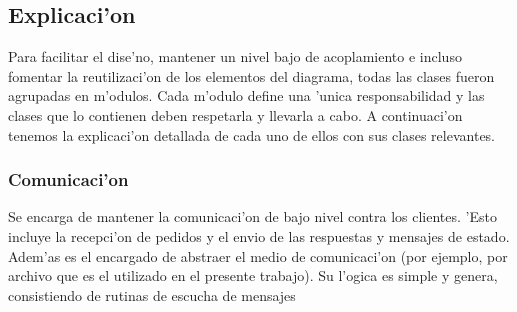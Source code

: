 \clearpage

\clearpage

\clearpage

\clearpage

\clearpage



\subsection{Explicaci'on}
Para facilitar el dise'no, mantener un nivel bajo de acoplamiento e incluso fomentar la reutilizaci'on de los elementos del diagrama, todas las clases fueron agrupadas en m'odulos. Cada m'odulo define una 'unica responsabilidad y las clases que lo contienen deben respetarla y llevarla a cabo. A continuaci'on tenemos la explicaci'on detallada de cada uno de ellos con sus clases relevantes.


\subsubsection{Comunicaci'on}
Se encarga de mantener la comunicaci'on de bajo nivel contra los clientes. 'Esto incluye la recepci'on de pedidos y el envio de las respuestas y mensajes de estado. Adem'as es el encargado de abstraer el medio de comunicaci'on (por ejemplo, por archivo que es el utilizado en el presente trabajo). Su l'ogica es simple y genera, consistiendo de rutinas de escucha de mensajes


